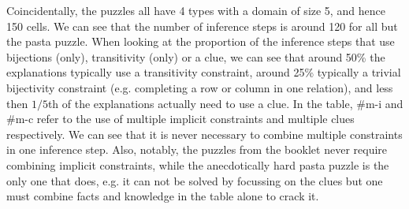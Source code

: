 Coincidentally, the puzzles all have 4 types with a domain of size 5, and hence 150 cells. We can see that the number of inference steps is around 120 for all but the pasta puzzle. When looking at the proportion of the inference steps that use bijections (only), transitivity (only) or a clue, we can see that around 50\% the explanations typically use a transitivity constraint, around 25\% typically a trivial bijectivity constraint (e.g. completing a row or column in one relation), and less then $1/5$th of the explanations actually need to use a clue.
In the table, \#m-i and \#m-c refer to the use of multiple implicit constraints and multiple clues respectively. We can see that it is never necessary to combine multiple constraints in one inference step. Also, notably, the puzzles from the booklet never require combining implicit constraints, while the anecdotically hard pasta puzzle is the only one that does, e.g. it can not be solved by focussing on the clues but one must combine facts and knowledge in the table alone to crack it.

\begin{table}
	\centering
\caption{Composition of puzzle explanations}
\label{table:composition}
\end{table}

